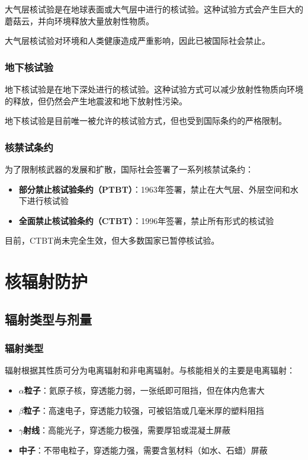 \documentclass[12pt,UTF8]{ctexbook}
\begin{document}
大气层核试验是在地球表面或大气层中进行的核试验。这种试验方式会产生巨大的蘑菇云，并向环境释放大量放射性物质。

大气层核试验对环境和人类健康造成严重影响，因此已被国际社会禁止。

\section{地下核试验}

地下核试验是在地下深处进行的核试验。这种试验方式可以减少放射性物质向环境的释放，但仍然会产生地震波和地下放射性污染。

地下核试验是目前唯一被允许的核试验方式，但也受到国际条约的严格限制。

\section{核禁试条约}

为了限制核武器的发展和扩散，国际社会签署了一系列核禁试条约：

\begin{itemize}[leftmargin=2cm]
    \item \textbf{部分禁止核试验条约（PTBT）}：1963年签署，禁止在大气层、外层空间和水下进行核试验
    \item \textbf{全面禁止核试验条约（CTBT）}：1996年签署，禁止所有形式的核试验
\end{itemize}

目前，CTBT尚未完全生效，但大多数国家已暂停核试验。

\part{核辐射防护}

\chapter{辐射类型与剂量}

\section{辐射类型}

辐射根据其性质可分为电离辐射和非电离辐射。与核能相关的主要是电离辐射：

\begin{itemize}[leftmargin=2cm]
    \item \textbf{$\alpha$粒子}：氦原子核，穿透能力弱，一张纸即可阻挡，但在体内危害大
    \item \textbf{$\beta$粒子}：高速电子，穿透能力较强，可被铝箔或几毫米厚的塑料阻挡
    \item \textbf{$\gamma$射线}：高能光子，穿透能力极强，需要厚铅或混凝土屏蔽
    \item \textbf{中子}：不带电粒子，穿透能力强，需要含氢材料（如水、石蜡）屏蔽
\end{itemize}
\end{document}
